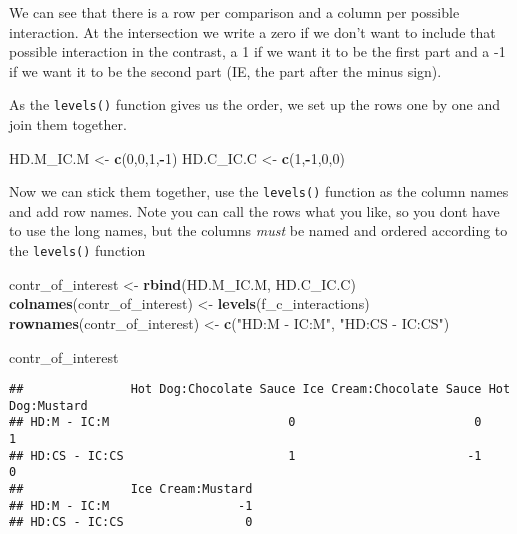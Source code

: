 \documentclass[]{book}
\newenvironment{Shaded}{\begin{snugshade}}{\end{snugshade}}
\newcommand{\DecValTok}[1]{\textcolor[rgb]{0.00,0.00,0.81}{#1}}
\newcommand{\KeywordTok}[1]{\textcolor[rgb]{0.13,0.29,0.53}{\textbf{#1}}}
\newcommand{\NormalTok}[1]{#1}
\newcommand{\OperatorTok}[1]{\textcolor[rgb]{0.81,0.36,0.00}{\textbf{#1}}}
\newcommand{\StringTok}[1]{\textcolor[rgb]{0.31,0.60,0.02}{#1}}
\begin{document}
We can see that there is a row per comparison and a column per possible interaction. At the intersection we write a zero if we don't want to include that possible interaction in the contrast, a 1 if we want it to be the first part and a -1 if we want it to be the second part (IE, the part after the minus sign).

As the \texttt{levels()} function gives us the order, we set up the rows one by one and join them together.

\begin{Shaded}
\begin{Highlighting}[]
\NormalTok{HD.M_IC.M <-}\StringTok{ }\KeywordTok{c}\NormalTok{(}\DecValTok{0}\NormalTok{,}\DecValTok{0}\NormalTok{,}\DecValTok{1}\NormalTok{,}\OperatorTok{-}\DecValTok{1}\NormalTok{)}
\NormalTok{HD.C_IC.C <-}\StringTok{ }\KeywordTok{c}\NormalTok{(}\DecValTok{1}\NormalTok{,}\OperatorTok{-}\DecValTok{1}\NormalTok{,}\DecValTok{0}\NormalTok{,}\DecValTok{0}\NormalTok{)}
\end{Highlighting}
\end{Shaded}

Now we can stick them together, use the \texttt{levels()} function as the column names and add row names. Note you can call the rows what you like, so you dont have to use the long names, but the columns \emph{must} be named and ordered according to the \texttt{levels()} function

\begin{Shaded}
\begin{Highlighting}[]
\NormalTok{contr_of_interest <-}\StringTok{ }\KeywordTok{rbind}\NormalTok{(HD.M_IC.M, HD.C_IC.C)}
\KeywordTok{colnames}\NormalTok{(contr_of_interest) <-}\StringTok{ }\KeywordTok{levels}\NormalTok{(f_c_interactions)}
\KeywordTok{rownames}\NormalTok{(contr_of_interest) <-}\StringTok{ }\KeywordTok{c}\NormalTok{(}\StringTok{"HD:M - IC:M"}\NormalTok{,}
          \StringTok{"HD:CS - IC:CS"}\NormalTok{)}

\NormalTok{contr_of_interest}
\end{Highlighting}
\end{Shaded}

\begin{verbatim}
##               Hot Dog:Chocolate Sauce Ice Cream:Chocolate Sauce Hot Dog:Mustard
## HD:M - IC:M                         0                         0               1
## HD:CS - IC:CS                       1                        -1               0
##               Ice Cream:Mustard
## HD:M - IC:M                  -1
## HD:CS - IC:CS                 0
\end{verbatim}
\end{document}
